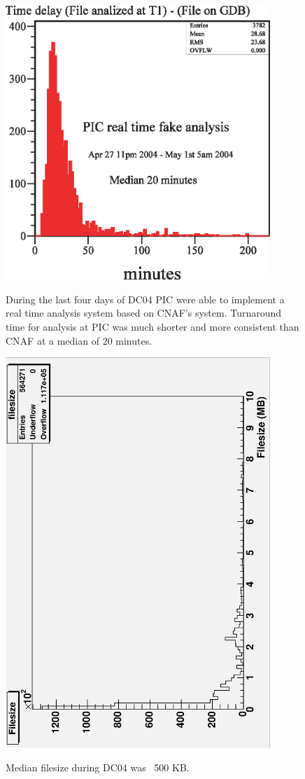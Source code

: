 \documentclass{cmspaper}
\begin{document}
\begin{figure}[tbp]
\centering
\includegraphics[width=10cm]{PIC-RTA.eps}
\label{fig:PIC-RTA}
\caption{During the last four days of DC04 PIC were able to implement a real time analysis system based on CNAF's system. Turnaround time for analysis at PIC was much shorter and more consistent than CNAF at a median of 20 minutes. }
\end{figure}
\clearpage
\begin{figure}[tbp]
\centering
\includegraphics[width=10cm, angle=-90]{filesizes.eps}
\label{fig:filesizes}
\caption{Median filesize during DC04 was ~500 KB.}
\end{figure}
\end{document}
